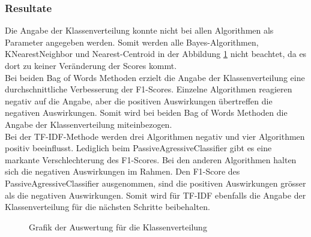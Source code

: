 \subsubsection{Resultate}
Die Angabe der Klassenverteilung konnte nicht bei allen Algorithmen als Parameter angegeben werden.
Somit werden alle Bayes-Algorithmen, KNearestNeighbor und Nearest-Centroid in der Abbildung \cref{abb:classweight} nicht beachtet, da es dort zu keiner Veränderung der Scores kommt.\\
Bei beiden \glqq Bag of Words\grqq{} Methoden erzielt die Angabe der Klassenverteilung eine durchschnittliche Verbesserung der F1-Scores.
Einzelne Algorithmen reagieren negativ auf die Angabe, aber die positiven Auswirkungen übertreffen die negativen Auswirkungen.
Somit wird bei beiden \glqq Bag of Words\grqq{} Methoden die Angabe der Klassenverteilung miteinbezogen.\\
Bei der TF-IDF-Methode werden drei Algorithmen negativ und vier Algorithmen positiv beeinflusst.
Lediglich beim PassiveAgressiveClassifier gibt es eine markante Verschlechterung des F1-Scores.
Bei den anderen Algorithmen halten sich die negativen Auswirkungen im Rahmen.
Den F1-Score des PassiveAgressiveClassifier ausgenommen, sind die positiven Auswirkungen grösser als die negativen Auswirkungen.
Somit wird für TF-IDF ebenfalls die Angabe der Klassenverteilung für die nächsten Schritte beibehalten.
\begin{figure}[H]	
	\setlength{\fboxsep}{0.3pt} 
	\setlength{\fboxrule}{0.3pt} 
	\caption{Grafik der Auswertung für die Klassenverteilung}
	\label{abb:classweight}
\end{figure}
